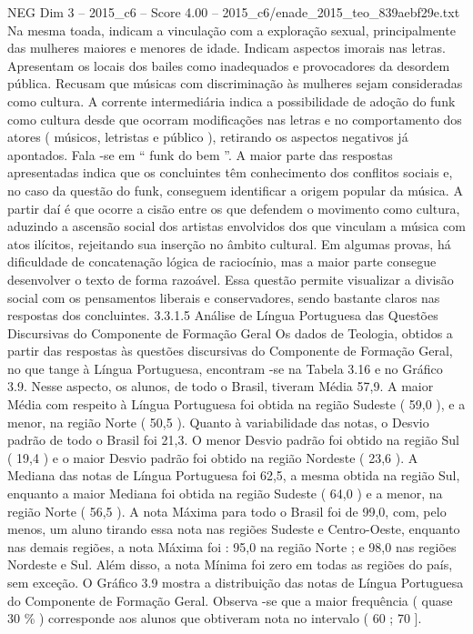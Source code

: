 \begin{textsample}{NEG Dim 3 – 2015\_c6 – Score 4.00 – 2015\_c6/enade\_2015\_teo\_839aebf29e.txt}
Na mesma toada, indicam a vinculação com a exploração sexual, principalmente das mulheres maiores e menores de idade.
Indicam aspectos imorais nas letras.
Apresentam os locais dos bailes como inadequados e provocadores da desordem pública.
Recusam que músicas com discriminação às mulheres sejam consideradas como cultura.
A corrente intermediária indica a possibilidade de adoção do funk como cultura desde que ocorram modificações nas letras e no comportamento dos atores ( músicos, letristas e público ), retirando os aspectos negativos já apontados.
Fala -se em “ funk do bem ”.
A maior parte das respostas apresentadas indica que os concluintes têm conhecimento dos conflitos sociais e, no caso da questão do funk, conseguem identificar a origem popular da música.
A partir daí é que ocorre a cisão entre os que defendem o movimento como cultura, aduzindo a ascensão social dos artistas envolvidos dos que vinculam a música com atos ilícitos, rejeitando sua inserção no âmbito cultural.
Em algumas provas, há dificuldade de concatenação lógica de raciocínio, mas a maior parte consegue desenvolver o texto de forma razoável.
Essa questão permite visualizar a divisão social com os pensamentos liberais e conservadores, sendo bastante claros nas respostas dos concluintes. 3.3.1.5 Análise de Língua Portuguesa das Questões Discursivas do Componente de Formação Geral Os dados de Teologia, obtidos a partir das respostas às questões discursivas do Componente de Formação Geral, no que tange à Língua Portuguesa, encontram -se na Tabela 3.16 e no Gráfico 3.9.
Nesse aspecto, os alunos, de todo o Brasil, tiveram Média 57,9.
A maior Média com respeito à Língua Portuguesa foi obtida na região Sudeste ( 59,0 ), e a menor, na região Norte ( 50,5 ).
Quanto à variabilidade das notas, o Desvio padrão de todo o Brasil foi 21,3.
O menor Desvio padrão foi obtido na região Sul ( 19,4 ) e o maior Desvio padrão foi obtido na região Nordeste ( 23,6 ).
A Mediana das notas de Língua Portuguesa foi 62,5, a mesma obtida na região Sul, enquanto a maior Mediana foi obtida na região Sudeste ( 64,0 ) e a menor, na região Norte ( 56,5 ).
A nota Máxima para todo o Brasil foi de 99,0, com, pelo menos, um aluno tirando essa nota nas regiões Sudeste e Centro-Oeste, enquanto nas demais regiões, a nota Máxima foi : 95,0 na região Norte ; e 98,0 nas regiões Nordeste e Sul.
Além disso, a nota Mínima foi zero em todas as regiões do país, sem exceção.
O Gráfico 3.9 mostra a distribuição das notas de Língua Portuguesa do Componente de Formação Geral.
Observa -se que a maior frequência ( quase 30 \% ) corresponde aos alunos que obtiveram nota no intervalo ( 60 ; 70 ].

\end{textsample}
